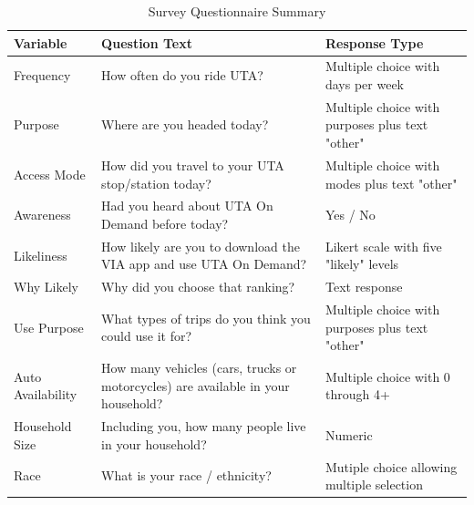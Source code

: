 \documentclass[smartcities,article,submit,moreauthors,pdftex]{Definitions/mdpi}
\begin{document}
\begin{table}[ht]
\renewcommand{\arraystretch}{1.5}
    \centering
    \caption{Survey Questionnaire Summary}
    \label{tab:survey-summary}
\begin{tabular}{l p{}p{}}
\toprule
Variable          & Question Text                                                                                    & Response Type                                     \\
\midrule
Frequency         & How often do you ride UTA?                                                                       & Multiple choice with days   per week              \\
Purpose           & Where are you headed today?                                                                      & Multiple choice with   purposes plus text "other" \\
Access Mode       & How did you travel to your   UTA stop/station today?                                             & Multiple choice with modes   plus text "other"    \\
Awareness         & Had you heard about UTA On   Demand before today?                                                & Yes / No                                          \\
Likeliness        & How likely are you to   download the VIA app and use UTA On Demand?                              & Likert scale with five   "likely" levels          \\
Why Likely        & Why did you choose that   ranking?                                                               & Text response                                     \\
Use Purpose       & What types of trips do you   think you could use it for?                                         & Multiple choice with   purposes plus text "other" \\
Auto Availability & How many vehicles (cars,   trucks or motorcycles) are available in your household?               & Multiple choice with 0   through 4+               \\
Household Size    & Including you, how many   people live in your household?                                         & Numeric                                           \\
Race              & What is your race /   ethnicity?                                                                 & Mutiple choice allowing   multiple selection      \\

\end{tabular}
\end{table}
\end{document}
